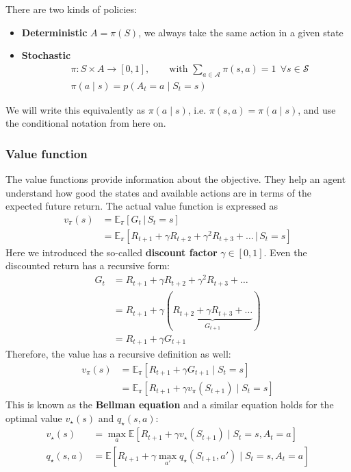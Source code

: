 There are two kinds of policies:
\begin{itemize}
    \item \textbf{Deterministic} $A=\pi(S)$, we always take the same action in a given state
    \item \textbf{Stochastic} 
    \begin{align*}
        &\pi : S \times A \to [0,1], \qquad \text{with } \sum_{a \in \mathcal{A}} \pi(s,a) = 1 \ \ \forall s \in \mathcal{S} \\
        &\pi(a \mid s) = p(A_t=a \mid S_t = s)
    \end{align*}
\end{itemize}

We will write this equivalently as $\pi(a \mid s)$, i.e. $\pi(s,a) = \pi(a \mid s)$, and use the conditional notation from here on.

\subsubsection{Value function}
The value functions provide information about the objective. They help an agent
understand how good the states and available actions are in terms of the expected future
return. The actual value function is expressed as
\begin{align*}
    v_\pi(s) &= \mathbb{E}_\pi[G_t \, | \, S_t=s] \\
             &= \mathbb{E}_\pi[R_{t+1}+\gamma R_{t+2} + \gamma^2 R_{t+3} +\dots \, | \, S_t=s]
\end{align*}
Here we introduced the so-called \textbf{discount factor} $\gamma \in [0,1]$. Even the discounted return has a recursive form:
\begin{align*}
    G_t &= R_{t+1}+\gamma R_{t+2} + \gamma^2 R_{t+3} + \dots \\
                  &= R_{t+1}+\gamma(\underbrace{R_{t+2} + \gamma R_{t+3} +\dots}_{G_{t+1}} ) \\
                  &= R_{t+1} + \gamma G_{t+1}
\end{align*}
Therefore, the value has a recursive definition as well:
\begin{align*}
    v_\pi(s) &= \mathbb{E}_\pi[R_{t+1} + \gamma G_{t+1} \mid S_t=s] \\
             &= \mathbb{E}_\pi[R_{t+1} + \gamma v_\pi(S_{t+1}) \mid S_t=s]
\end{align*}
This is known as the \textbf{Bellman equation} and a similar equation holds for the optimal value $v_\star(s)$ and $q_\star(s,a)$:
\begin{align*}
    v_\star(s) &= \max_{a} \mathbb{E}[R_{t+1}+\gamma v_\star(S_{t+1}) \mid S_t = s, A_t = a]\\
    q_\star(s,a) &= \mathbb{E}\!\left[R_{t+1} + \gamma \max_{a'} q_\star(S_{t+1}, a') \mid S_t = s, A_t = a\right]
\end{align*}

